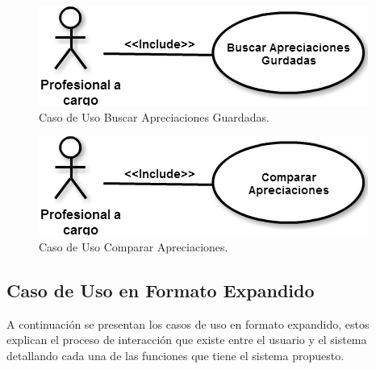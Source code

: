 \begin{figure}[htb]
	\label{Figura14}
	\begin{center}
		\includegraphics[scale=0.5]{imagenes/CDU4.png}
	\end{center}
	\caption{Caso de Uso Buscar Apreciaciones Guardadas.}
\end{figure}

\begin{figure}[htb]
	\label{Figura15}
	\begin{center}
		\includegraphics[scale=0.5]{imagenes/CDU5.png}
	\end{center}
	\caption{Caso de Uso Comparar Apreciaciones.}
\end{figure}



\subsection{Caso de Uso en Formato Expandido}
A continuación se presentan los casos de uso en formato expandido, estos explican el proceso de interacción que existe entre el usuario y el sistema detallando cada una de las funciones que tiene el sistema propuesto. 
 
